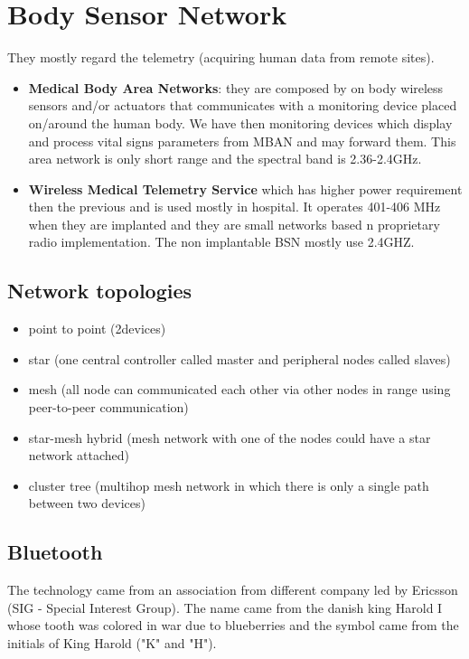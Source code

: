 \chapter{Body Sensor Network}
They mostly regard the telemetry (acquiring human data from remote sites).
\begin{itemize}
\item \textbf{Medical Body Area Networks}: they are composed by on body wireless sensors and/or actuators that communicates with a monitoring device placed on/around the human body. We have then monitoring devices which display and process vital signs parameters from MBAN and may forward them. This area network is only short range and the spectral band is 2.36-2.4GHz.
\item \textbf{Wireless Medical Telemetry Service} which has higher power requirement then the previous and is used mostly in hospital. It operates 401-406 MHz when they are implanted and they are small networks based n proprietary radio implementation. The non implantable BSN mostly use 2.4GHZ.
\end{itemize}
\section{Network topologies}
\begin{itemize}
	\item point to point (2devices)
	\item star (one central controller called master and peripheral nodes called slaves)
	\item mesh (all node can communicated each other via other nodes in range using peer-to-peer communication)
	\item star-mesh hybrid (mesh network with one of the nodes could have a star network attached)
	\item cluster tree (multihop mesh network in which there is only a single path between two devices)

\end{itemize}
\section{Bluetooth}
The technology came from an association from different company led by Ericsson (SIG - Special Interest Group). The name came from the danish king Harold I whose tooth was colored in war due to blueberries and the symbol came from the initials of King Harold ("K" and "H").

